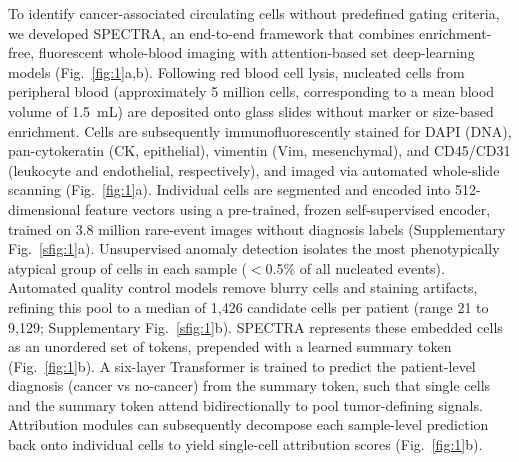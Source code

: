 \documentclass[11pt]{article}
\begin{document}
To identify cancer-associated circulating cells without predefined gating criteria, we developed SPECTRA, an end-to-end framework that combines enrichment-free, fluorescent whole-blood imaging with attention-based set deep-learning models (Fig.~\ref{fig:1}a,b). Following red blood cell lysis, nucleated cells from peripheral blood (approximately 5 million cells, corresponding to a mean blood volume of 1.5~mL) are deposited onto glass slides without marker or size-based enrichment. Cells are subsequently immunofluorescently stained for DAPI (DNA), pan-cytokeratin (CK, epithelial), vimentin (Vim, mesenchymal), and CD45/CD31 (leukocyte and endothelial, respectively), and imaged via automated whole-slide scanning (Fig.~\ref{fig:1}a). Individual cells are segmented and encoded into 512-dimensional feature vectors using a pre-trained, frozen self-supervised encoder, trained on 3.8 million rare-event images without diagnosis labels (Supplementary Fig.~\ref{sfig:1}a)\cite{naghdloo2025blue}. Unsupervised anomaly detection isolates the most phenotypically atypical group of cells in each sample ($<$0.5\% of all nucleated events)\cite{murgoitio2025}. Automated quality control models remove blurry cells and staining artifacts, refining this pool to a median of 1,426 candidate cells per patient (range 21 to 9,129; Supplementary Fig.~\ref{sfig:1}b). SPECTRA represents these embedded cells as an unordered set of tokens, prepended with a learned summary token (Fig.~\ref{fig:1}b). A six-layer Transformer is trained to predict the patient-level diagnosis (cancer vs no-cancer) from the summary token, such that single cells and the summary token attend bidirectionally to pool tumor-defining signals. Attribution modules can subsequently decompose each sample-level prediction back onto individual cells to yield single-cell attribution scores (Fig.~\ref{fig:1}b).
\end{document}
